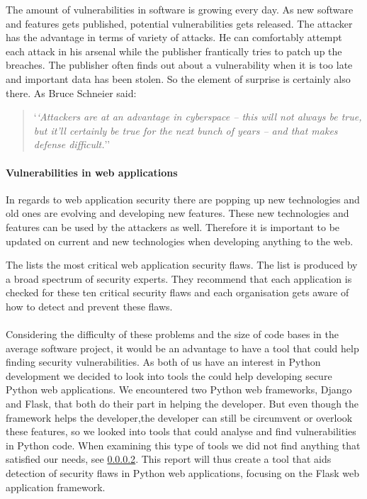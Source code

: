 The amount of vulnerabilities in software is growing every day.
As new software and features gets published, potential vulnerabilities gets released.
The attacker has the advantage in terms of variety of attacks.
He can comfortably attempt each attack in his arsenal while the publisher frantically tries to patch up the breaches.
The publisher often finds out about a vulnerability when it is too late and important data has been stolen.
So the element of surprise is certainly also there.
As Bruce Schneier said:
\begin{quote}
`\textit{`Attackers are at an advantage in cyberspace – this will not always be true, but it’ll certainly be true for the next bunch of years – and that makes defense difficult.}''\cite{schneier_interview}  
\end{quote}

\paragraph{Vulnerabilities in web applications}
In regards to web application security there are popping up new technologies and old ones are evolving and developing new features.
These new technologies and features can be used by the attackers as well.
Therefore it is important to be updated on current and new technologies when developing anything to the web.\cite{web_security_importance}

The \citet{OWASP10} lists the most critical web application security flaws.
The list is produced by a broad spectrum of security experts. 
They recommend that each application is checked for these ten critical security flaws and each organisation gets aware of how to detect and prevent these flaws.

\paragraph{}
Considering the difficulty of these problems and the size of code bases in the average software project, it would be an advantage to have a tool that could help finding security vulnerabilities.
As both of us have an interest in Python development we decided to look into tools the could help developing secure Python web applications.
We encountered two Python web frameworks, Django and Flask, that both do their part in helping the developer.
But even though the framework helps the developer,the developer can still be circumvent or overlook these features, so we looked into tools that could analyse and find vulnerabilities in Python code.
When examining this type of tools we did not find anything that satisfied our needs, see \cref{}.
This report will thus create a tool that aids detection of security flaws in Python web applications, focusing on the Flask web application framework.
